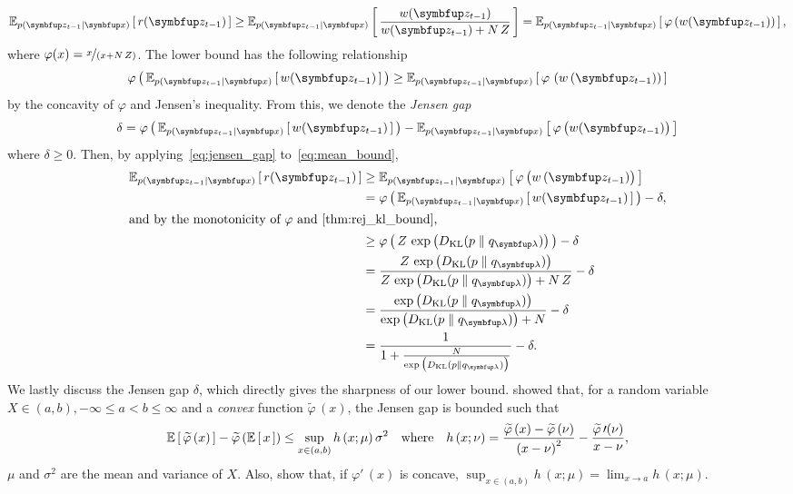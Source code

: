 \begin{proofEnd}
  \begin{equation}
    \Esub{p(\vz_{t-1}\mid\vx)}{ r(\vz_{t-1}) } \geq \Esub{p(\vz_{t-1}\mid\vx)}{ \frac{w(\vz_{t-1})}{w(\vz_{t-1}) + N\,Z}} =
    \Esub{p(\vz_{t-1}\mid\vx)}{ \varphi\left( w(\vz_{t-1}) \right)  },\label{eq:mean_bound}
  \end{equation}
  where \(\varphi(x) = \nicefrac{x}{(x + N\,Z)}\).
  The lower bound has the following relationship
  \begin{equation}
    \varphi\left(\,
    \Esub{p(\vz_{t-1}\mid\vx)}{ w(\vz_{t-1}) }
    \,\right)
    \geq
    \Esub{p(\vz_{t-1}\mid\vx)}{ \varphi\,\left( w\,(\vz_{t-1}) \right)  }
  \end{equation}
  by the concavity of \(\varphi\) and Jensen's inequality.
  From this, we denote the \textit{Jensen gap}
  \begin{equation}
    \delta = 
    \varphi\left(\,
    \Esub{p(\vz_{t-1}\mid\vx)}{ w(\vz_{t-1}) }
    \,\right)
    -
    \Esub{p(\vz_{t-1}\mid\vx)}{ \varphi\,\big( w(\vz_{t-1}) \big)  }\label{eq:jensen_gap}
  \end{equation}
  where \(\delta \geq 0\).
  Then, by applying~\eqref{eq:jensen_gap} to~\eqref{eq:mean_bound},
  \begin{align}
    \Esub{p(\vz_{t-1}\mid\vx)}{ r(\vz_{t-1}) }
    &\geq \Esub{p(\vz_{t-1}\mid\vx)}{ \varphi\,\big( w\,(\vz_{t-1}) \big)  } \\
    &= \varphi\left(\,
    \Esub{p(\vz_{t-1}\mid\vx)}{ w(\vz_{t-1}) }
    \,\right) - \delta, \\
\intertext{and by the monotonicity of \(\varphi\) and~\cref{thm:rej_kl_bound},}
    &\geq \varphi\left(\,
    Z\,\exp\big(\DKL{p}{q_{\vlambda}}\big)
    \,\right) - \delta \\
    &=
    \frac{
      Z\,\exp\big(\DKL{p}{q_{\vlambda}}\big)
    }{
      Z\,\exp\big(\DKL{p}{q_{\vlambda}}\big) + N\,Z
    } - \delta \\
    &= \frac{
      \exp\big(\DKL{p}{q_{\vlambda}}\big)
    }{
      \exp\big(\DKL{p}{q_{\vlambda}}\big) + N
    } - \delta \\
    &= \frac{1}{
       1 + \frac{N}{
         \exp\big(\DKL{p}{q_{\vlambda}}\big) 
      }
    } - \delta.
  \end{align}
  We lastly discuss the Jensen gap \(\delta\), which directly gives the sharpness of our lower bound.
  \citet[Theorem 1]{liao_sharpening_2019} showed that, for a random variable \(X \in (a, b), -\infty \leq a < b \leq \infty\) and a \textit{convex} function \(\widetilde{\varphi}\,(x)\), the Jensen gap is bounded such that
  \begin{align}
    \mathbb{E}\left[\,\widetilde{\varphi}\,(x)\,\right] - \widetilde{\varphi}\,(\mathbb{E}\left[\,x\,\right])
    \leq
    \sup_{x \in (a,b)} h\,(x; \mu) \, \sigma^2
    \quad \text{where}\quad h\,(x; \nu) = \frac{\widetilde{\varphi}\,(x) - \widetilde{\varphi}\,(\nu)}{{(x - \nu)}^2} - \frac{ \widetilde{\varphi}\,\prime(\nu) }{ x - \nu },\label{eq:jensen_gap_bound}
  \end{align}
\(\mu\) and \(\sigma^2\) are the mean and variance of \(X\).
Also, \citet[Lemma 1]{liao_sharpening_2019} show that, if \(\varphi\prime\,(x)\) is concave,  \(\sup_{x \in (a,b)} h\,(x; \mu) = \lim_{x \rightarrow a} h\,(x; \mu) \). 


\end{proofEnd}
